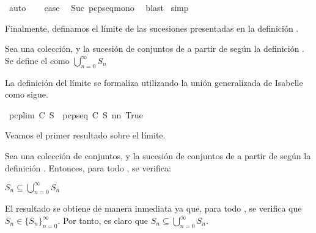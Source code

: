 \begin{isabellebody}
\ auto\isanewline
\ \ \isamarkupfalse%
\ {\isacharquery}case\ \isamarkupfalse%
\ Suc\ pcp{\isacharunderscore}seq{\isacharunderscore}mono\ \isamarkupfalse%
\ blast\isanewline
{}\isamarkupfalse%
\ simp%
\endisatagproof
{\isafoldproof}%
%
\isadelimproof
%
\endisadelimproof
%
\begin{isamarkuptext}%
Finalmente, definamos el límite de las sucesiones presentadas en la definición .

 \begin{definicion}
  Sea  una colección,  y  la sucesión de conjuntos de  a partir de  según la
  definición . Se define el  como 
  $\bigcup_{n = 0}^{\infty} S_{n}$
 \end{definicion}

  La definición del límite se formaliza utilizando la unión generalizada de Isabelle como sigue.%
\end{isamarkuptext}\isamarkuptrue%
\isamarkupfalse%
\ {\isachardoublequoteopen}pcp{\isacharunderscore}lim\ C\ S\ {\isasymequiv}\ {\isasymUnion}{\isacharbraceleft}pcp{\isacharunderscore}seq\ C\ S\ n{\isacharbar}n{\isachardot}\ True{\isacharbraceright}{\isachardoublequoteclose}%
\begin{isamarkuptext}%
Veamos el primer resultado sobre el límite.

\begin{lema}
  Sea  una colección de conjuntos,  y  la sucesión de conjuntos de  a partir de
   según la definición . Entonces, para todo , se verifica:

  $S_{n} \subseteq \bigcup_{n = 0}^{\infty} S_{n}$
\end{lema}

\begin{demostracion}
  El resultado se obtiene de manera inmediata ya que, para todo , se verifica que 
  $S_{n} \in \{S_{n}\}_{n = 0}^{\infty}$. Por tanto, es claro que 
  $S_{n} \subseteq \bigcup_{n = 0}^{\infty} S_{n}$.
\end{demostracion}


\end{isamarkuptext}
\end{isabellebody}
